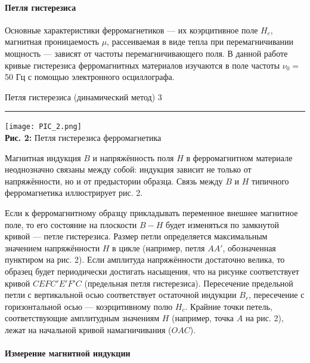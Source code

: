 \documentclass[12pt,a4paper]{scrartcl}
\begin{document}
	\paragraph{Петля гистерезиса} \hfill
	
	Основные характеристики
ферромагнетиков — их коэрцитивное поле $H_c$, магнитная проницаемость
$\mu$, рассеиваемая в виде тепла при перемагничивании мощность — зависят
от частоты перемагничивающего поля. В данной работе кривые гистерезиса ферромагнитных материалов изучаются в поле частоты $\nu_0 =$ 50 Гц
с помощью электронного осциллографа.

	\newpage


	\begin{flushleft}
		\footnotesize{Петля гистерезиса (динамический метод)} \hspace{\fill} \footnotesize{3}
		\\[-0.3cm]\noindent\rule{\textwidth}{0.3pt}
	\end{flushleft}	
		
	\begin{center}
		\texttt{[image: PIC\_2.png]}
		\\\textbf{Рис. 2: } Петля гистерезиса ферромагнетика
	\end{center}
	
	Магнитная индукция $ B $ и напряжённость поля $ H $ в ферромагнитном материале неоднозначно связаны между собой: индукция зависит
не только от напряжённости, но и от предыстории образца. Связь между $ B $ и $ H $ типичного ферромагнетика иллюстрирует рис. 2.

Если к ферромагнитному образцу прикладывать переменное внешнее
магнитное поле, то его состояние на плоскости $ B-H $ будет изменяться
по замкнутой кривой — петле гистерезиса. Размер петли определяется
максимальным значением напряжённости $ H $ в цикле (например, петля $ AA' $,
обозначенная пунктиром на рис. 2). Если амплитуда напряжённости достаточно велика, то образец будет периодически достигать насыщения,
что на рисунке соответствует кривой $ CEFC'E'F'C $ (предельная петля
гистерезиса). Пересечение предельной петли с вертикальной осью соответствует остаточной индукции $B_r$, пересечение с горизонтальной осью
— коэрцитивному полю $H_c$. Крайние точки петель, соответствующие амплитудным значениям $ H $ (например, точка $ A $ на рис. 2), лежат на начальной кривой намагничивания ($ OAC $).
	
	\paragraph{Измерение магнитной индукции} \hfill
	
\end{document}

